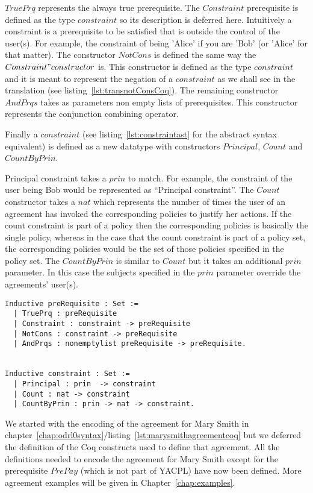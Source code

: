$TruePrq$ represents the always true prerequisite. The $Constraint$ prerequisite is defined as the type $constraint$ so its description is deferred here. Intuitively a constraint is a prerequisite to be satisfied that is outside the control of the user(s). For example, the constraint of being 'Alice' if you are 'Bob' (or 'Alice' for that matter). The constructor $NotCons$ is defined the same way the $Constraint" constructor$ is. This constructor is defined as the type $constraint$ and it is meant to represent the negation of a $constraint$ as we shall see in the translation (see listing~\ref{lst:transnotConsCoq}). The remaining constructor $AndPrqs$ takes as parameters non empty lists of prerequisites. This constructor represents the conjunction combining operator. 

Finally a $constraint$ (see  listing~\ref{lst:constraintast} for the abstract syntax equivalent) is defined as a new datatype with constructors $Principal$, $Count$ and $CountByPrin$. 

Principal constraint takes a $prin$ to match. For example, the constraint of the user being Bob would be represented as ``Principal constraint''. The $Count$ constructor takes a $nat$ which represents the number of times the user of an agreement has invoked the corresponding policies to justify her actions. If the count constraint is part of a policy then the corresponding policies is basically the single policy, whereas in the case that the count constraint is part of a policy set, the corresponding policies would be the set of those policies specified in the policy set. The $CountByPrin$ is similar to $Count$ but it takes an additional $prin$ parameter. In this case the subjects specified in the $prin$ parameter override the agreements' user(s).   

\lstset{language=Coq}
\begin{minipage}[c]{0.95\textwidth}
\begin{lstlisting}[frame=single, caption={preRequisite},label={lst:preRequisitecoq}]
Inductive preRequisite : Set :=
  | TruePrq : preRequisite
  | Constraint : constraint -> preRequisite 
  | NotCons : constraint -> preRequisite 
  | AndPrqs : nonemptylist preRequisite -> preRequisite.
  
  
Inductive constraint : Set :=
  | Principal : prin  -> constraint 
  | Count : nat -> constraint 
  | CountByPrin : prin -> nat -> constraint.

\end{lstlisting}
\end{minipage}

We started with the encoding of the agreement for Mary Smith in chapter~\ref{chap:odrl0syntax}/listing~\ref{lst:marysmithagreementcoq} but we deferred the definition of the Coq constructs used to define that agreement. All the definitions needed to encode the agreement for Mary Smith except for the prerequisite $PrePay$ (which is not part of YACPL) have now been defined. More agreement examples will be given in Chapter~\ref{chap:examples}.
